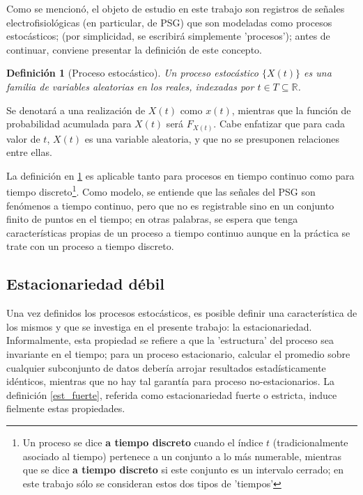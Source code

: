 \documentclass[12pt,a4paper]{mitthesis}
\newtheorem{defn}{Definici\'on}
\newcommand{\R}{\mathbb{R}}
\begin{document}
Como se mencion\'o, el objeto de estudio en este trabajo son registros de se\~nales
electrofisiol\'ogicas (en particular, de PSG) que son modeladas como procesos estoc\'asticos; (por 
simplicidad, se escribir\'a simplemente 'procesos'); antes de continuar, conviene presentar la 
definici\'on de este concepto. 

\begin{defn}[Proceso estoc\'astico]
Un proceso estoc\'astico $\{ X(t) \}$ es una familia de variables aleatorias en los reales, 
indexadas por $t \in T \subseteq \R$.
\label{proc_estocastico}
\end{defn}

Se denotar\'a a una realizaci\'on de $X(t)$ como $x(t)$, mientras que la funci\'on de probabilidad 
acumulada para $X(t)$ ser\'a $F_{X(t)}$. Cabe enfatizar que para cada valor de $t$, $X(t)$ es una 
variable  aleatoria, y que no se presuponen relaciones entre ellas.

La definici\'on en \ref{proc_estocastico} es aplicable tanto para procesos en tiempo continuo como 
para tiempo discreto\footnote{Un proceso se dice \textbf{a tiempo discreto} cuando el \'indice $t$ 
(tradicionalmente asociado al tiempo) pertenece a un conjunto a lo m\'as numerable, mientras que se 
dice \textbf{a tiempo discreto} si este conjunto es un intervalo cerrado; en este trabajo s\'olo se 
consideran estos dos tipos de 'tiempos'}.
Como modelo, se entiende que las se\~nales del PSG son fen\'omenos a tiempo continuo, pero que no
es registrable sino en un conjunto finito de puntos en el tiempo; en otras palabras, se espera que 
tenga caracter\'isticas propias de un proceso a tiempo continuo aunque en la pr\'actica se trate 
con un proceso a tiempo discreto.

\subsection{Estacionariedad d\'ebil}

Una vez definidos los procesos estoc\'asticos, es posible definir una caracter\'istica de los 
mismos y que se investiga en el presente trabajo: la estacionariedad.
Informalmente, esta propiedad se refiere a que la 'estructura' del proceso sea invariante en el
tiempo; para un proceso estacionario, calcular el promedio sobre cualquier subconjunto de datos 
deber\'ia arrojar resultados estad\'isticamente id\'enticos, mientras que no hay tal garant\'ia
para proceso no-estacionarios.
La definici\'on \ref{est_fuerte}, referida como estacionariedad fuerte o estricta, induce fielmente 
estas propiedades.
\end{document}
